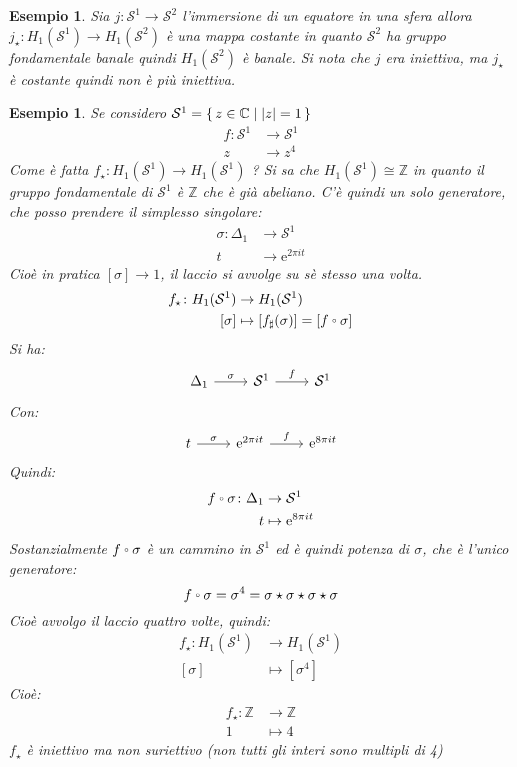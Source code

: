 \documentclass[10pt, twoside=false, x11names]{scrbook}
\newtheorem{example}[theorem]{Esempio}
\newcommand{\Z}{\mathbb{Z}}
\newcommand{\me}{\mathrm{e}}
\newcommand{\Sph}[1][]{\mathcal{S}^#1}
\let\latexcirc=\circ
\newcommand{\ccirc}{\mathbin{\mathchoice
  {\xcirc\scriptstyle}
  {\xcirc\scriptstyle}
  {\xcirc\scriptscriptstyle}
  {\xcirc\scriptscriptstyle}
}}
\newcommand{\xcirc}[1]{\vcenter{\hbox{$#1\latexcirc$}}}
\let\circ\ccirc
\begin{document}
\begin{example}
  Sia $ j \colon \Sph{1} \to \Sph{2} $ l'immersione di un equatore in una sfera allora
  $ j_\star \colon H_1(\Sph{1}) \to H_1(\Sph{2}) $  è una mappa costante in quanto $ \Sph{2} $
  ha gruppo fondamentale banale quindi $ H_1(\Sph{2}) $ è banale.
  Si nota che $ j $ era iniettiva,  ma $ j_\star $ è costante quindi non è più iniettiva.
\end{example}
\begin{example}
  Se considero $ \Sph{1} = \set{z \in \mathbb{C} | |z| = 1 } $
  \begin{align*}
    f \colon \Sph{1} & \to \Sph{1} \\
    z & \to z^4
  \end{align*}
  Come è fatta $ f_\star \colon H_1(\Sph{1}) \to H_1(\Sph{1})$ ?
  Si sa che $ H_1(\Sph{1}) \cong \Z $ in quanto il gruppo fondamentale di $ \Sph{1} $
  è $ \Z $ che è già abeliano. C'è quindi un solo generatore, che posso prendere
  il simplesso singolare:
  \begin{align*}
    \sigma \colon \Delta_1 & \to \Sph{1} \\
    t & \to \me^{2 \pi i t}
  \end{align*}
  Cioè in pratica $ [\sigma] \to 1 $, il laccio si avvolge su sè stesso una volta.
  \begin{align*}
    f_\star \colon H_1(\Sph{1}) & \to H_1(\Sph{1}) \\
    [\sigma] & \mapsto [f_\sharp (\sigma)] = [f \circ \sigma]
  \end{align*}
  Si ha:
  \[
    \begin{tikzcd}
      \Delta_1 \arrow{r}{\sigma} & \Sph{1} \arrow{r}{f} & \Sph{1}
    \end{tikzcd}
  \]
  Con:
  \[
    \begin{tikzcd}
      t \arrow{r}{\sigma} & \me^{2 \pi i t} \arrow{r}{f} & \me^{8 \pi i t}
    \end{tikzcd}
  \]
  Quindi:
  \begin{align*}
    f \circ \sigma \colon \Delta_1 & \to \Sph{1} \\
    t & \mapsto \me^{8 \pi i t}
  \end{align*}
  Sostanzialmente $ f \circ \sigma $ è un cammino in $ \Sph{1} $ ed è
  quindi potenza di $ \sigma $, che è l'unico generatore:
  \[
    f \circ \sigma = \sigma^4 = \sigma \star \sigma \star \sigma \star \sigma
  \]
  Cioè avvolgo il laccio quattro volte, quindi:
  \begin{align*}
    f_\star \colon H_1(\Sph{1}) & \to H_1(\Sph{1}) \\
    [\sigma] & \mapsto [\sigma^4]
  \end{align*}
  Cioè:
  \begin{align*}
    f_\star \colon \Z & \to \Z \\
    1 & \mapsto 4
  \end{align*}
  $ f_\star $ è iniettivo ma non suriettivo (non tutti gli interi sono
  multipli di 4)
\end{example}
\end{document}

